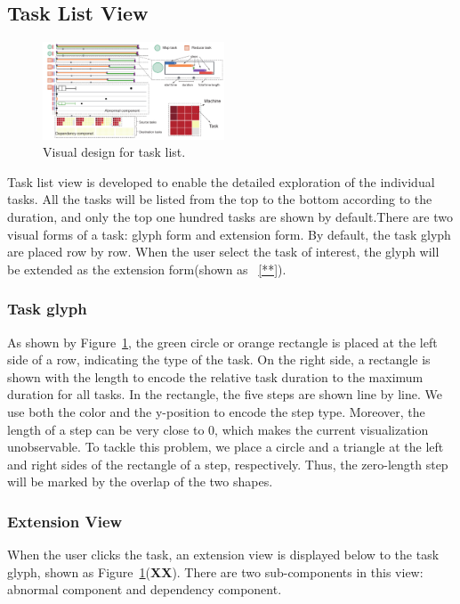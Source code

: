 \subsection{Task List View}


\begin{figure}[t]
	\centering
	\includegraphics[width=0.48\textwidth]{figures/visualization/taskList.pdf}
	\vspace{-3mm}
	\caption{Visual design for task list.}
	\label{fig:taskList}
	\vspace{-3mm}
\end{figure}

Task list view is developed to enable the detailed exploration of the individual tasks.
All the tasks will be listed from the top to the bottom according to the duration, and only the top one hundred tasks are shown by default.There are two visual forms of a task: glyph form and extension form. By default, the task glyph are placed row by row. When the user select the task of interest, the glyph will be extended as the extension form(shown as ~\ref{**}).


\subsubsection{Task glyph}
As shown by Figure~\ref{fig:taskList}, the green circle or orange rectangle is placed at the left side of a row, indicating the type of the task. On the right side, a rectangle is shown with the length to encode the relative task duration to the maximum duration for all tasks. In the rectangle, the five steps are shown line by line. We use both the color and the y-position to encode the step type. Moreover, the length of a step can be very close to 0, which makes the current visualization unobservable. To tackle this problem, we place a circle and a triangle at the left and right sides of the rectangle of a step, respectively. Thus, the zero-length step will be marked by the overlap of the two shapes.

\subsubsection{Extension View}
When the user clicks the task, an extension view is displayed below to the task glyph, shown as Figure~\ref{fig:taskList}(\textbf{XX}). There are two sub-components in this view: abnormal component and dependency component. 


